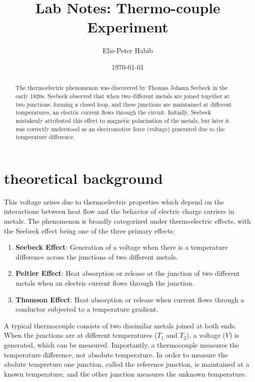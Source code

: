 \documentclass[12pt,a4paper]{article}
\title{Lab Notes: Thermo-couple Experiment}
\author{Elie-Peter Habib}
\date{\today}
\begin{document}
\maketitle

\tableofcontents
\pagebreak
\section{theoretical background}
\begin{abstract}
  The thermoelectric phenomenon was discovered by Thomas Johann Seebeck in the early 1820s. Seebeck observed that when two different metals are joined together at two junctions, forming a closed loop, and these junctions are maintained at different temperatures, an electric current flows through the circuit. Initially, Seebeck mistakenly attributed this effect to magnetic polarization of the metals, but later it was correctly understood as an electromotive force (voltage) generated due to the temperature difference.
\end{abstract}

This voltage arises due to thermoelectric properties which depend on the interactions between heat flow and the behavior of electric charge carriers in metals. The phenomenon is broadly categorized under thermoelectric effects, with the Seebeck effect being one of the three primary effects:

\begin{enumerate}
    \item \textbf{Seebeck Effect}: Generation of a voltage when there is a temperature difference across the junctions of two different metals.
    \item \textbf{Peltier Effect}: Heat absorption or release at the junction of two different metals when an electric current flows through the junction.
    \item \textbf{Thomson Effect}: Heat absorption or release when current flows through a conductor subjected to a temperature gradient.
\end{enumerate}

A typical thermocouple consists of two dissimilar metals joined at both ends. When the junctions are at different temperatures ($T_1$ and $T_2$), a voltage ($V$) is generated, which can be measured. Importantly, a thermocouple measures the temperature difference, not absolute temperature. In order to measure the abolute tempreture one junction, called the reference junction, is maintained at a known temperature, and the other junction measures the unknown temperature.
\end{document}
